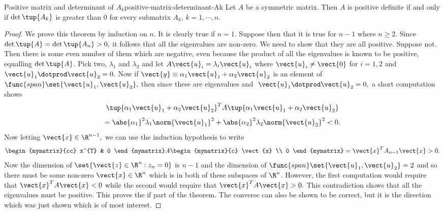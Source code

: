 \begin{theorem}{Positive matrix and determinant of $A_k$}{positive-matrix-determinant-Ak}   
Let $A$ be a symmetric matrix. Then $A$ is positive definite if
and only if $\det \tup{A_{k}}$ is greater than $0$ for every submatrix $A_{k}$,  $k=1,\cdots ,n$. 
\end{theorem}

\begin{proof}
We prove this theorem by induction on $n.$ It is clearly
true if $n=1.$ Suppose then that it is true for $n-1$ where $n\geq 2$. Since 
$\det \tup{A} =\det \tup{A_{n}} >0,$ it follows that all the
eigenvalues are non-zero. We need to show that they are all positive. Suppose
not. Then there is some even number of them which are negative, even because
the product of all the eigenvalues is known to be positive, equalling $\det
\tup{A} $. Pick two, $\lambda _{1}$ and $\lambda _{2}$ and let $A
\vect{u}_{i}=\lambda _{i}\vect{u}_{i}$ where $\vect{u}_{i}\neq \vect{0}$ for $
i=1,2$ and $\vect{u}_{1}\dotprod \vect{u}_{2}=0.$ Now if $\vect{y}\equiv \alpha
_{1}\vect{u}_{1}+\alpha _{2}\vect{u}_{2}$ is an element of $\func{span}\set{
\vect{u}_{1},\vect{u}_{2}} ,$ then since these are eigenvalues and $\ 
\vect{u}_{1}\dotprod \vect{u}_{2}=0,$ a short computation shows 
\begin{equation*}
\tup{\alpha _{1}\vect{u}_{1}+\alpha _{2}\vect{u}_{2}} ^{T}A\tup{
\alpha _{1}\vect{u}_{1}+\alpha _{2}\vect{u}_{2}}
\end{equation*}
\begin{equation*}
=\abs{\alpha _{1}}^{2}\lambda _{1}\norm{\vect{u}
_{1}} ^{2}+\abs{\alpha _{2}}^{2}\lambda
_{2}\norm{\vect{u}_{2}} ^{2}<0.
\end{equation*}
Now letting $\vect{x}\in \R^{n-1},$ we can use the induction
hypothesis to write 
\begin{equation*}
\begin{mymatrix}{cc}
x^{T} & 0
\end{mymatrix} A\begin{mymatrix}{c}
\vect{x} \\ 
0
\end{mymatrix} =\vect{x}^{T}A_{n-1}\vect{x}>0.
\end{equation*}
Now the dimension of $\set{\vect{z}\in \R^{n}:z_{n}=0} $ is 
$n-1$ and the dimension of $\func{span}\set{\vect{u}_{1},\vect{u}
_{2}} =2$ and so there must be some non-zero $\vect{x}\in \R
^{n} $ which is in both of these subspaces of $\R^{n}$. However, the
first computation would require that $\vect{x}^{T}A\vect{x}<0$ while the
second would require that $\vect{x}^{T}A\vect{x}>0.$ This contradiction shows
that all the eigenvalues must be positive. This proves the if part of the
theorem. The converse can also be shown to be correct, but it is the
direction which was just shown which is of most interest. 
\end{proof}

